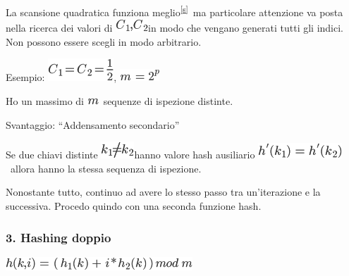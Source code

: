 \documentclass{article}
\begin{document}
{}

{La scansione quadratica }{funziona
meglio}\textsuperscript{\protect\hyperlink{cmnt19}{{[}s{]}}}{~ma
particolare attenzione va posta nella ricerca dei valori di
}\includegraphics{images/image291.png}{in modo che vengano generati
tutti gli indici. Non possono essere scegli in modo arbitrario.}

{}

{Esempio}{: }\includegraphics{images/image292.png}{,
}\includegraphics{images/image266.png}

{}

{Ho un massimo di }\includegraphics{images/image235.png}{~sequenze di
ispezione distinte.}

{}

{Svantaggio}{: ``Addensamento secondario''}

{Se due chiavi distinte }\includegraphics{images/image293.png}{hanno
valore hash ausiliario }\includegraphics{images/image294.png}{~allora
hanno la stessa sequenza di ispezione.}

{}

{Nonostante tutto, continuo ad avere lo stesso passo tra un'iterazione e
la successiva. Procedo quindo con una seconda funzione hash.}

\hypertarget{h.8kg9yyirra9i}{\subsubsection{\texorpdfstring{{3.
}{Hashing doppio}}{3. Hashing doppio}}\label{h.8kg9yyirra9i}}

\includegraphics{images/image295.png}
\end{document}
